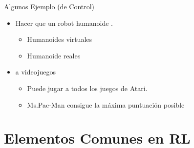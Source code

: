 \documentclass[10pt, envcountsect, handout, aspectratio=1610, hyperref={hypertexnames=true}]{beamer}
\begin{document}
\begin{frame}{Algunos Ejemplo (de Control)}
\begin{itemize}
\begin{itemize}
\item Alpha-Go de \citep{silver2016mastering} 
\href{https://youtube.com/playlist?list=PLqYmG7hTraZBy7J_4ynYPc0Ml1RUGcLmD&si=yry-NQMmirBbXIHF}{\large {}}
y Alpha-Zero \citep{silver2017AlphaZero} de David Silver et.al. (Deepmind-Google) son sistemas que han ganado a campeones el mundo.
\end{itemize}



\item Hacer que un robot humanoide . 

\begin{itemize}
\item Humanoides virtuales \citep{hess2017emergence}
\href{https://www.youtube.com/watch?v=gn4nRCC9TwQ}{\large {}}
\href{https://www.youtube.com/watch?v=hx_bgoTF7bs}{\large {}}

\item Humanoide reales \citep{radosavovic2023realhumanoid}
\href{https://learning-humanoid-locomotion.github.io/}{\large {}}
\href{https://youtu.be/eFoBfFhwo18?si=LeIvPqAeearQ7k0j}{\large {}}
\end{itemize}



\item {} a videojuegos 

\begin{itemize}
\item Puede jugar a todos los juegos de Atari. \citep{mnih2013playing} \href{https://www.youtube.com/watch?v=TmPfTpjtdgg}{\large {}}
\item Ms.Pac-Man consigue la máxima puntuación posible \citep{VaSeijen2017}  \href{https://www.youtube.com/watch?v=zQyWMHFjewU}{\large {}}
\end{itemize}


\end{itemize}


\end{frame}   




\section{Elementos Comunes en RL}
\end{document}
